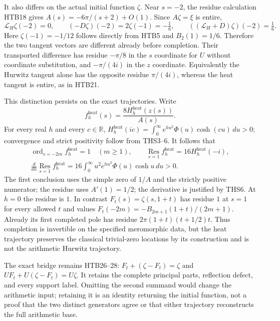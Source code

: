\documentclass[11pt]{article}
\theoremstyle{definition}
\begin{document}
It also differs on the actual initial function $\zeta$. Near
$s=-2$, the residue calculation HTB18 gives
$A(s)=-6\pi/(s+2)+O(1)$. Since $A\zeta=\xi$ is entire,
\begin{equation}\tag{CFD19}
 \mathcal L_H\zeta(-2)=0,\qquad
 (-D\zeta)(-2)=2\zeta(-1)=-\tfrac16,\qquad
 ((\mathcal L_H+D)\zeta)(-2)=\tfrac16.
\end{equation}
Here $\zeta(-1)=-1/12$ follows directly from HTB5 and
$B_2(1)=1/6$. Therefore the two tangent vectors are different
already before completion. Their transported difference has
residue $-\pi/8$ in the $s$ coordinate for $U$ without coordinate
substitution, and $-\pi/(4i)$ in the $z$ coordinate. Equivalently
the Hurwitz tangent alone has the opposite residue $\pi/(4i)$,
whereas the heat tangent is entire, as in HTB21.

This distinction persists on the exact trajectories. Write
\begin{equation}\tag{CFD20}
 f_h^{\mathrm{heat}}(s)=\frac{8H_h^{\mathrm{heat}}(z(s))}{A(s)}.
\end{equation}
For every real $h$ and every $c\in\mathbb R$,
$H_h^{\mathrm{heat}}(ic)=\int_0^\infty
e^{hu^2}\Phi(u)\cosh(cu)\,du>0$; convergence and strict
positivity follow from THS3--6. It follows that
\begin{equation}\tag{CFD21}
\begin{gathered}
 \operatorname{ord}_{s=-2m}f_h^{\mathrm{heat}}=1\quad(m\ge1),
 \qquad
 \operatorname*{Res}_{s=1}f_h^{\mathrm{heat}}
                       =16H_h^{\mathrm{heat}}(-i),\\
 \frac{d}{dh}\operatorname*{Res}_{s=1}f_h^{\mathrm{heat}}
       =16\int_0^\infty u^2e^{hu^2}\Phi(u)\cosh u\,du>0.
\end{gathered}
\end{equation}
The first conclusion uses the simple zero of $1/A$ and the
strictly positive numerator; the residue uses $A'(1)=1/2$;
the derivative is justified by THS6. At $h=0$ the residue is
$1$. In contrast $F_t(s)=\zeta(s,1+t)$ has residue $1$ at
$s=1$ for every allowed $t$ and values
$F_t(-2m)=-B_{2m+1}(1+t)/(2m+1)$. Already its first completed
pole has residue $2\pi(1+t)(t+1/2)t$. Thus completion is
invertible on the specified meromorphic data, but the heat
trajectory preserves the classical trivial-zero locations by
its construction and is not the arithmetic Hurwitz trajectory.

The exact bridge remains HTB26--28:
$F_t+(\zeta-F_t)=\zeta$ and
$UF_t+U(\zeta-F_t)=U\zeta$. It retains the complete principal
parts, reflection defect, and every support label. Omitting the
second summand would change the arithmetic input; retaining it
is an identity returning the initial function, not a proof that
the two distinct generators agree or that either trajectory
reconstructs the full arithmetic base.
\end{document}
